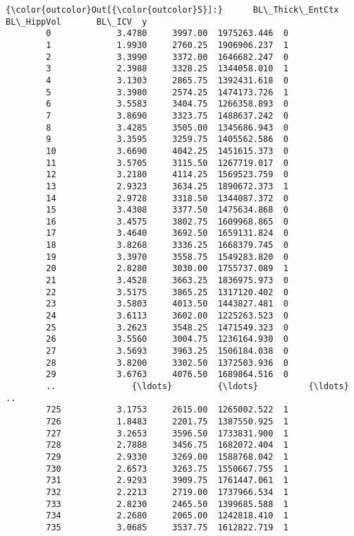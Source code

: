 \documentclass[11pt]{article}
\begin{document}
\begin{Verbatim}[commandchars=\\\{\}]
{\color{outcolor}Out[{\color{outcolor}5}]:}      BL\_Thick\_EntCtx  BL\_HippVol       BL\_ICV  y
        0             3.4780     3997.00  1975263.446  0
        1             1.9930     2760.25  1906906.237  1
        2             3.3990     3372.00  1646682.247  0
        3             2.3988     3328.25  1344058.010  1
        4             3.1303     2865.75  1392431.618  0
        5             3.3980     2574.25  1474173.726  1
        6             3.5583     3404.75  1266358.893  0
        7             3.8690     3323.75  1488637.242  0
        8             3.4285     3505.00  1345686.943  0
        9             3.3595     3259.75  1405562.586  0
        10            3.6690     4042.25  1451615.373  0
        11            3.5705     3115.50  1267719.017  0
        12            3.2180     4114.25  1569523.759  0
        13            2.9323     3634.25  1890672.373  1
        14            2.9728     3318.50  1344087.372  0
        15            3.4308     3377.50  1475634.868  0
        16            3.4575     3802.75  1609968.865  0
        17            3.4640     3692.50  1659131.824  0
        18            3.8268     3336.25  1668379.745  0
        19            3.3970     3558.75  1549283.820  0
        20            2.8280     3030.00  1755737.089  1
        21            3.4528     3663.25  1836975.973  0
        22            3.5175     3865.25  1317120.402  0
        23            3.5803     4013.50  1443827.481  0
        24            3.6113     3602.00  1225263.523  0
        25            3.2623     3548.25  1471549.323  0
        26            3.5560     3004.75  1236164.930  0
        27            3.5693     3963.25  1506184.038  0
        28            3.8200     3302.50  1372503.936  0
        29            3.6763     4076.50  1689864.516  0
        ..               {\ldots}         {\ldots}          {\ldots} ..
        725           3.1753     2615.00  1265002.522  1
        726           1.8483     2201.75  1387550.925  1
        727           3.2653     3596.50  1733831.900  1
        728           2.7888     3456.75  1682072.404  1
        729           2.9330     3269.00  1588768.042  1
        730           2.6573     3263.75  1550667.755  1
        731           2.9293     3909.75  1761447.061  1
        732           2.2213     2719.00  1737966.534  1
        733           2.8230     2465.50  1399685.588  1
        734           2.2680     2065.00  1242818.410  1
        735           3.0685     3537.75  1612822.719  1

\end{Verbatim}
\end{document}
